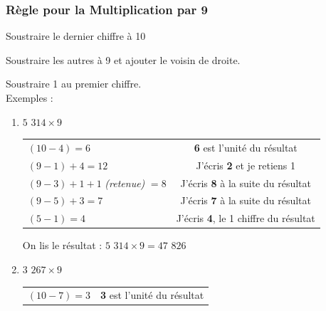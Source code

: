 \documentclass[a4paper, twoside]{article}
\begin{document}
		\vfill

		\newpage





		\subsubsection*{Règle pour la Multiplication par 9}

		Soustraire le dernier chiffre à 10

		Soustraire les autres à 9 et ajouter le voisin de droite.

		Soustraire 1 au premier chiffre.\\

		{ \parindent=0.5cm Exemples : }

		\begin{small}
		\begin{enumerate}

			\item $5$ $314 \times 9$
			
			\begin{tabular}{l|c}

				$(10 - 4) = 6$ & \textbf{6} est l'unité du résultat
				
				\tabularnewline
				
				$(9 - 1) + 4 = 12$ & J'écris \textbf{2} et je retiens 1
				
				\tabularnewline
				
				$(9 - 3) + 1 + 1$ \textit{(retenue)} $= 8$ & J'écris \textbf{8} à la suite du résultat
				
				\tabularnewline
				
				$(9 - 5) + 3 = 7$ & J'écris \textbf{7} à la suite du résultat
				
				\tabularnewline
				
				$(5 - 1)  = 4$ & J'écris \textbf{4}, le 1\up{er} chiffre du résultat
				
			\end{tabular}

			On lis le résultat : {\boldmath $5$ $314 \times 9 = 47$ $826$}\\
			
			


			\item $3$ $267 \times 9$
			
			\begin{tabular}{l|c}

				$(10 - 7) = 3$ & \textbf{3} est l'unité du résultat
				

\end{tabular}
\end{enumerate}
\end{small}
\end{document}
